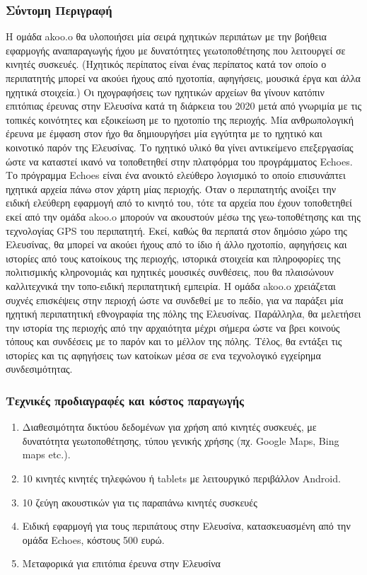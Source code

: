 \subsubsection{Σύντομη Περιγραφή}
\label{sec:org0a2d9b5}
Η ομάδα akoo.o θα υλοποιήσει μία σειρά ηχητικών περιπάτων με την βοήθεια εφαρμογής αναπαραγωγής ήχου με δυνατότητες γεωτοποθέτησης που λειτουργεί σε κινητές συσκευές. (Ηχητικός περίπατος είναι ένας περίπατος κατά τον οποίο ο περιπατητής μπορεί να ακούει ήχους από ηχοτοπία, αφηγήσεις, μουσικά έργα και άλλα ηχητικά στοιχεία.)  Οι ηχογραφήσεις των ηχητικών αρχείων θα γίνουν κατόπιν επιτόπιας έρευνας στην Ελευσίνα κατά τη διάρκεια του 2020 μετά από γνωριμία με τις τοπικές κοινότητες και εξοικείωση με το ηχοτοπίο της περιοχής. Μία ανθρωπολογική έρευνα με έμφαση στον ήχο θα δημιουργήσει μία εγγύτητα με το ηχητικό και κοινοτικό παρόν της Ελευσίνας. Το ηχητικό υλικό θα γίνει αντικείμενο επεξεργασίας ώστε να καταστεί ικανό να τοποθετηθεί στην πλατφόρμα του προγράμματος Echoes. Το πρόγραμμα Echoes είναι ένα ανοικτό ελεύθερο λογισμικό το οποίο επισυνάπτει ηχητικά αρχεία πάνω στον χάρτη μίας περιοχής. Όταν ο περιπατητής ανοίξει την ειδική ελεύθερη εφαρμογή από το κινητό του, τότε τα αρχεία που έχουν τοποθετηθεί εκεί από την ομάδα akoo.o μπορούν να ακουστούν μέσω της γεω-τοποθέτησης και της τεχνολογίας GPS του περιπατητή. Εκεί, καθώς θα περπατά στον δημόσιο χώρο της Ελευσίνας, θα μπορεί να ακούει ήχους από το ίδιο ή άλλο ηχοτοπίο, αφηγήσεις και ιστορίες από τους κατοίκους της περιοχής, ιστορικά στοιχεία και πληροφορίες της πολιτισμικής κληρονομιάς και ηχητικές μουσικές συνθέσεις, που θα πλαισώνουν καλλιτεχνικά την τοπο-ειδική περιπατητική εμπειρία. Η ομάδα akoo.o χρειάζεται συχνές επισκέψεις στην περιοχή ώστε να συνδεθεί με το πεδίο, για να παράξει μία ηχητική περιπατητική εθνογραφία της πόλης της Ελευσίνας. Παράλληλα, θα μελετήσει την ιστορία της περιοχής από την αρχαιότητα μέχρι σήμερα ώστε να βρει κοινούς τόπους και συνδέσεις με το παρόν και το μέλλον της πόλης. Τέλος, θα εντάξει τις ιστορίες και τις αφηγήσεις των κατοίκων μέσα σε ενα τεχνολογικό εγχείρημα συνδεσιμότητας.

\subsubsection{Τεχνικές προδιαγραφές και κόστος παραγωγής}
\label{sec:org80ec5fd}

\begin{enumerate}
\item Διαθεσιμότητα δικτύου δεδομένων για χρήση από κινητές συσκευές, με δυνατότητα γεωτοποθέτησης, τύπου γενικής χρήσης (πχ. Google Maps, Bing maps etc.).
\item 10 κινητές κινητές τηλεφώνου ή tablets με λειτουργικό περιβάλλον Android.
\item 10 ζεύγη ακουστικών για τις παραπάνω κινητές συσκευές
\item Ειδική εφαρμογή για τους περιπάτους στην Ελευσίνα, κατασκευασμένη από την ομάδα Echoes, κόστους 500 ευρώ.
\item Μεταφορικά για επιτόπια έρευνα στην Ελευσίνα
\end{enumerate}

